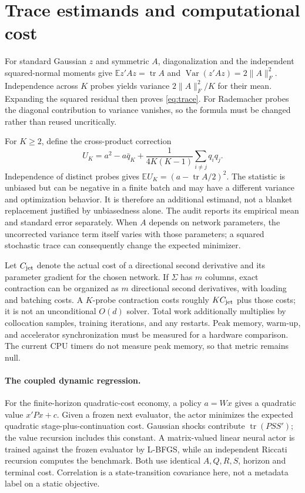 \section{Trace estimands and computational cost}
\label{app:trace}
For standard Gaussian $z$ and symmetric $A$, diagonalization and the independent squared-normal moments give
$\mathbb E z'Az=\operatorname{tr}A$ and $\operatorname{Var}(z'Az)=2\|A\|_F^2$.
Independence across $K$ probes yields variance $2\|A\|_F^2/K$ for their mean. Expanding the squared residual then proves \eqref{eq:trace}. For Rademacher probes the diagonal contribution to variance vanishes, so the formula must be changed rather than reused uncritically.

For $K\geq2$, define the cross-product correction
\begin{equation}
U_K=a^2-a\bar q_K+\frac{1}{4K(K-1)}\sum_{i\ne j}q_iq_j.
\label{eq:U}
\end{equation}
Independence of distinct probes gives $\mathbb E U_K=(a-\operatorname{tr}A/2)^2$. The statistic is unbiased but can be negative in a finite batch and may have a different variance and optimization behavior. It is therefore an additional estimand, not a blanket replacement justified by unbiasedness alone. The audit reports its empirical mean and standard error separately. When $A$ depends on network parameters, the uncorrected variance term itself varies with those parameters; a squared stochastic trace can consequently change the expected minimizer.

Let $C_{\rm jet}$ denote the actual cost of a directional second derivative and its parameter gradient for the chosen network. If $\Sigma$ has $m$ columns, exact contraction can be organized as $m$ directional second derivatives, with loading and batching costs. A $K$-probe contraction costs roughly $K C_{\rm jet}$ plus those costs; it is not an unconditional $O(d)$ solver. Total work additionally multiplies by collocation samples, training iterations, and any restarts. Peak memory, warm-up, and accelerator synchronization must be measured for a hardware comparison. The current CPU timers do not measure peak memory, so that metric remains null.

\paragraph{The coupled dynamic regression.}
For the finite-horizon quadratic-cost economy, a policy $a=Wx$ gives a quadratic value $x'Px+c$. Given a frozen next evaluator, the actor minimizes the expected quadratic stage-plus-continuation cost. Gaussian shocks contribute $\operatorname{tr}(PSS')$; the value recursion includes this constant. A matrix-valued linear neural actor is trained against the frozen evaluator by L-BFGS, while an independent Riccati recursion computes the benchmark. Both use identical $A,Q,R,S$, horizon and terminal cost. Correlation is a state-transition covariance here, not a metadata label on a static objective.

